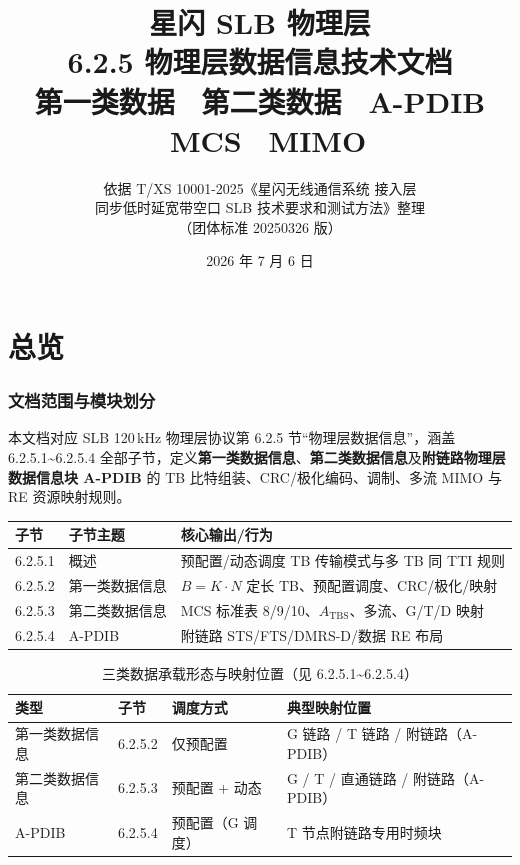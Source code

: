 \documentclass[11pt,a4paper]{ctexart}
\title{%
  \textbf{星闪 SLB 物理层}\\[0.4em]
  \Large 6.2.5 物理层数据信息技术文档\\[0.3em]
  \large 第一类数据 \textbullet\ 第二类数据 \textbullet\ A-PDIB \textbullet\ MCS \textbullet\ MIMO
}
\author{依据 T/XS 10001-2025《星闪无线通信系统 接入层\\
同步低时延宽带空口 SLB 技术要求和测试方法》整理\\
（团体标准 20250326 版）}
\date{2026 年 7 月 6 日}
\begin{document}
\maketitle
\tableofcontents
\newpage

\part{总览}

\section{文档范围与模块划分}

本文档对应 SLB 120\,kHz 物理层协议第 6.2.5 节``物理层数据信息''，涵盖 6.2.5.1\textasciitilde 6.2.5.4 全部子节，定义\textbf{第一类数据信息}、\textbf{第二类数据信息}及\textbf{附链路物理层数据信息块 A-PDIB} 的 TB 比特组装、CRC/极化编码、调制、多流 MIMO 与 RE 资源映射规则。

\begin{table}[h]
\centering
\small
\begin{tabular}{L{2.2cm}L{4.2cm}L{6.1cm}}
\toprule
\textbf{子节} & \textbf{子节主题} & \textbf{核心输出/行为} \\
.5.1 & 概述 & 预配置/动态调度 TB 传输模式与多 TB 同 TTI 规则 \\
6.2.5.2 & 第一类数据信息 & $B{=}K{\cdot}N$ 定长 TB、预配置调度、CRC/极化/映射 \\
6.2.5.3 & 第二类数据信息 & MCS 标准表 8/9/10、$A_{\mathrm{TBS}}$、多流、G/T/D 映射 \\
6.2.5.4 & A-PDIB & 附链路 STS/FTS/DMRS-D/数据 RE 布局 \\
\bottomrule
\end{tabular}
\end{table}

\begin{table}[h]
\centering
\small
\caption{三类数据承载形态与映射位置（见 6.2.5.1\textasciitilde 6.2.5.4）}
\begin{tabular}{L{3.2cm}L{2.2cm}L{3.2cm}L{4.9cm}}
\toprule
\textbf{类型} & \textbf{子节} & \textbf{调度方式} & \textbf{典型映射位置} \\
\midrule
第一类数据信息 & 6.2.5.2 & 仅预配置 & G 链路 / T 链路 / 附链路（A-PDIB） \\
第二类数据信息 & 6.2.5.3 & 预配置 + 动态 & G / T / 直通链路 / 附链路（A-PDIB） \\
A-PDIB & 6.2.5.4 & 预配置（G 调度） & T 节点附链路专用时频块 \\
\bottomrule
\end{tabular}
\end{table}
\end{document}
